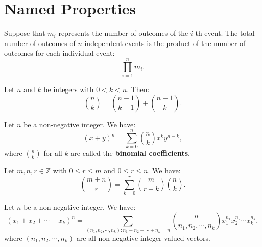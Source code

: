 \documentclass{huhtakm-template-book-v2}
\begin{document}
\section*{Named Properties}
    \begin{spro}
        Suppose that $m_{i}$ represents the number of outcomes of the $i$-th event. The total number of outcomes of $n$ independent events is the product of the number of outcomes for each individual event:
        \begin{equation*}
            \prod_{i = 1}^{n}m_{i}.
        \end{equation*} 
    \end{spro}
    \begin{spro}
        Let $n$ and $k$ be integers with $0 < k < n$. Then:
        \begin{equation*}
            \binom{n}{k} = \binom{n-1}{k-1} + \binom{n-1}{k}.
        \end{equation*}
    \end{spro}
    \begin{spro}
        Let $n$ be a non-negative integer. We have:
        \begin{equation*}
            (x + y)^{n} = \sum_{k = 0}^{n}\binom{n}{k}x^{k}y^{n-k},
        \end{equation*} 
        where $\binom{n}{k}$ for all $k$ are called the \textbf{binomial coefficients}.
    \end{spro}
    \begin{spro}
        Let $m, n, r \in \mathbb{Z}$ with $0 \leq r \leq m$ and $0 \leq r \leq n$. We have:
        \begin{equation*}
            \binom{m+n}{r} = \sum_{k = 0}^{r}\binom{m}{r-k}\binom{n}{k}.
        \end{equation*}
    \end{spro}
    \begin{spro}
        Let $n$ be a non-negative integer. We have:
        \begin{equation*}
            (x_{1} + x_{2} + \cdots + x_{k})^{n} = \sum_{(n_{1}, n_{2}, \cdots, n_{k}) : n_{1} + n_{2} + \cdots + n_{k} = n}\binom{n}{n_{1}, n_{2}, \cdots, n_{k}}x_{1}^{n_{1}}x_{2}^{n_{2}} \cdots x_{k}^{n_{k}},
        \end{equation*}
        where $(n_{1}, n_{2}, \cdots, n_{k})$ are all non-negative integer-valued vectors.
    \end{spro}
\end{document}

